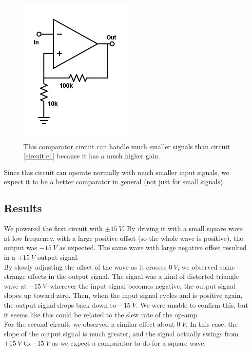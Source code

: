 \documentclass[11pt]{article}
\begin{document}
\begin{figure}[H]
    \centering
    \includegraphics[scale=0.5]{Diagrams/c-e2.png}
    \caption{This comparator circuit can handle much smaller signals than circuit \ref{circuit:e1} because it has a much higher gain.}
\end{figure}

Since this circuit can operate normally with much smaller input signals, we expect it to be a better comparator in general (not just for small signals).\\


\subsection{Results}

We powered the first circuit with $\pm 15\ V$. By driving it with a small square wave at low frequency, with a large positive offset (so the whole wave is positive), the output was $-15\ V$ as expected. The same wave with large negative offset resulted in a $+15\ V$ output signal.\\

By slowly adjusting the offset of the wave as it crosses $0\ V$, we observed some strange effects in the output signal. The signal was a kind of distorted triangle wave at $-15\ V$--wherever the input signal becomes negative, the output signal slopes up toward zero. Then, when the input signal cycles and is positive again, the output signal drops back down to $-15\ V$. We were unable to confirm this, but it seems like this could be related to the slew rate of the op-amp.\\

For the second circuit, we observed a similar effect about $0\ V$. In this case, the slope of the output signal is much greater, and the signal actually swings from $+15\ V$ to $-15\ V$ as we expect a comparator to do for a square wave.\\
\end{document}
